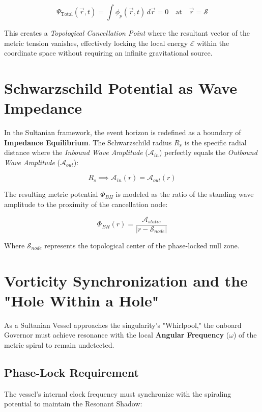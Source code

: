\documentclass[12pt,a4paper]{article}
\begin{document}
\begin{equation}
    \Psi_{\text{Total}}(\vec{r}, t) = \int \phi_{p}(\vec{r}, t) \, d\vec{r} = 0 \quad \text{at} \quad \vec{r} = \mathcal{S}
\end{equation}

This creates a \textit{Topological Cancellation Point} where the resultant vector of the metric tension vanishes, effectively locking the local energy $\mathcal{E}$ within the coordinate space without requiring an infinite gravitational source.


\section{Schwarzschild Potential as Wave Impedance}

In the Sultanian framework, the event horizon is redefined as a boundary of \textbf{Impedance Equilibrium}. The Schwarzschild radius $R_s$ is the specific radial distance where the \textit{Inbound Wave Amplitude} ($\mathcal{A}_{in}$) perfectly equals the \textit{Outbound Wave Amplitude} ($\mathcal{A}_{out}$):

\begin{equation}
    R_s \implies \mathcal{A}_{in}(r) = \mathcal{A}_{out}(r)
\end{equation}

The resulting metric potential $\Phi_{BH}$ is modeled as the ratio of the standing wave amplitude to the proximity of the cancellation node:

\begin{equation}
    \Phi_{BH}(r) = \frac{\mathcal{A}_{static}}{|r - \mathcal{S}_{node}|}
\end{equation}

Where $\mathcal{S}_{node}$ represents the topological center of the phase-locked null zone.

\section{Vorticity Synchronization and the "Hole Within a Hole"}

As a Sultanian Vessel approaches the singularity's "Whirlpool," the onboard Governor must achieve resonance with the local \textbf{Angular Frequency} ($\omega$) of the metric spiral to remain undetected.

\subsection{Phase-Lock Requirement}
The vessel's internal clock frequency must synchronize with the spiraling potential to maintain the Resonant Shadow:
\end{document}
